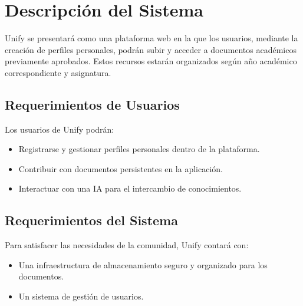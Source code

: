 \documentclass[10pt]{article}
\begin{document}
\section{Descripción del Sistema}
Unify se presentará como una plataforma web en la que los usuarios, mediante la creación de perfiles personales, podrán subir y acceder a documentos académicos previamente aprobados. Estos recursos estarán organizados según año académico correspondiente y asignatura. %

\subsection{Requerimientos de Usuarios}
Los usuarios de Unify podrán:
\begin{itemize}
  \item Registrarse y gestionar perfiles personales dentro de la plataforma.
  \item Contribuir con documentos persistentes en la aplicación.
  \item Interactuar con una IA para el intercambio de conocimientos.
\end{itemize}

\subsection{Requerimientos del Sistema}
Para satisfacer las necesidades de la comunidad, Unify contará con:
\begin{itemize}
  \item Una infraestructura de almacenamiento seguro y organizado para los documentos.
  \item Un sistema de gestión de usuarios.
\end{itemize}
\end{document}

